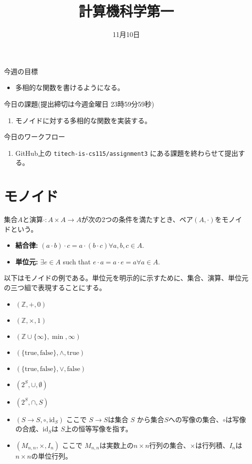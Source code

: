 \documentclass[a4paper,twoside,onecolumn,openany,article]{memoir}
\title{計算機科学第一}
\date{11月10日}
\theoremstyle{remark}
\begin{document}
\maketitle

\noindent
今週の目標
\begin{itemize}
\item 多相的な関数を書けるようになる。
\end{itemize}

\noindent
今日の課題(提出締切は今週金曜日 23時59分59秒)
\begin{enumerate}
\item 
モノイドに対する多相的な関数を実装する。
\end{enumerate}

\noindent
今日のワークフロー
\begin{enumerate}
\item GitHub上の \verb|titech-is-cs115/assignment3| にある課題を終わらせて提出する。
\end{enumerate}

\section{モノイド}\label{sec:monoid}
集合$A$と演算$\cdot: A\times A\to A$が次の2つの条件を満たすとき、ペア$(A,\cdot)$をモノイドという。
\begin{itemize}
\item {\bfseries 結合律:} $(a\cdot b)\cdot c = a\cdot(b\cdot c)$\qquad $\forall a, b, c \in A$.
\item {\bfseries 単位元:} $\exists e \in A$ such that $e \cdot a = a\cdot e = a$\qquad $\forall a \in A$.
\end{itemize}
以下はモノイドの例である。単位元を明示的に示すために、集合、演算、単位元の三つ組で表現することにする。
\begin{itemize}
\item $(\mathbb{Z}, +, 0)$
\item $(\mathbb{Z}, \times, 1)$
\item $(\mathbb{Z}\cup\{\infty\}, \min, \infty)$
\item $(\{\mathrm{true}, \mathrm{false}\}, \wedge, \mathrm{true})$
\item $(\{\mathrm{true}, \mathrm{false}\}, \vee, \mathrm{false})$
\item $(2^{S}, \cup, \emptyset)$
\item $(2^{S}, \cap, S)$
\item $(S\to S, \circ, \mathrm{id}_S)$ ここで $S\to S$は集合 $S$ から集合$S$への写像の集合、$\circ$は写像の合成、$\mathrm{id}_S$は $S$上の恒等写像を指す。
\item $(M_{n,n}, \times, I_n)$ ここで $M_{n,n}$は実数上の$n\times n$行列の集合、$\times$は行列積、$I_n$は$n\times n$の単位行列。
\end{itemize}
\end{document}
